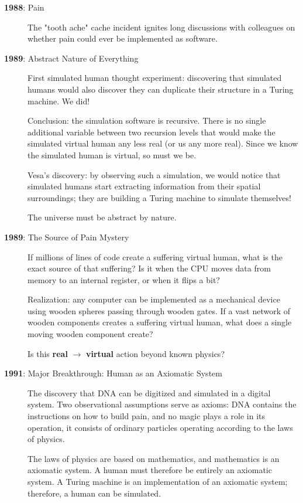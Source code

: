 \begin{description}

\item[\textbf{1988}: Pain]
  The "tooth ache" cache incident ignites long discussions with colleagues on whether pain could ever be implemented as software.

\item[\textbf{1989}: Abstract Nature of Everything]
  First simulated human thought experiment: discovering that simulated humans would also discover they can duplicate their structure in a Turing machine. We did!

  Conclusion: the simulation software is recursive. There is no single additional variable between two recursion levels that would make the simulated virtual human any less real (or us any more real). Since we know the simulated human is virtual, so must we be.

  Vesa's discovery: by observing such a simulation, we would notice that simulated humans start extracting information from their spatial surroundings; they are building a Turing machine to simulate themselves!

  The universe must be abstract by nature.

\item[\textbf{1989}: The Source of Pain Mystery]
  If millions of lines of code create a suffering virtual human, what is the exact source of that suffering? Is it when the CPU moves data from memory to an internal register, or when it flips a bit?

  Realization: any computer can be implemented as a mechanical device using wooden spheres passing through wooden gates. If a vast network of wooden components creates a suffering virtual human, what does a single moving wooden component create?

  Is this \textbf{real} $\rightarrow$ \textbf{virtual} action beyond known physics?

\item[\textbf{1991}: Major Breakthrough: Human as an Axiomatic System]
  The discovery that DNA can be digitized and simulated in a digital system. Two observational assumptions serve as axioms: DNA contains the instructions on how to build pain, and no magic plays a role in its operation, it consists of ordinary particles operating according to the laws of physics.

  The laws of physics are based on mathematics, and mathematics is an axiomatic system. A human must therefore be entirely an axiomatic system. A Turing machine is an implementation of an axiomatic system; therefore, a human can be simulated.


\end{description}
